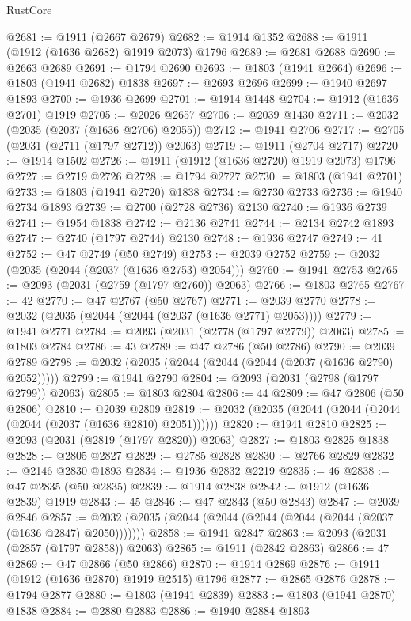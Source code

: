 \begin{lexlean}{RustCore}
\begin{coremodule}
@2681 := @1911 (@2667 @2679)
@2682 := @1914 @1352
@2688 := @1911 (@1912 (@1636 @2682) @1919 @2073) @1796
@2689 := @2681 @2688
@2690 := @2663 @2689
@2691 := @1794 @2690
@2693 := @1803 (@1941 @2664)
@2696 := @1803 (@1941 @2682) @1838
@2697 := @2693 @2696
@2699 := @1940 @2697 @1893
@2700 := @1936 @2699
@2701 := @1914 @1448
@2704 := @1912 (@1636 @2701) @1919
@2705 := @2026 @2657
@2706 := @2039 @1430
@2711 := @2032 (@2035 (@2037 (@1636 @2706) @2055))
@2712 := @1941 @2706
@2717 := @2705 (@2031 (@2711 (@1797 @2712)) @2063)
@2719 := @1911 (@2704 @2717)
@2720 := @1914 @1502
@2726 := @1911 (@1912 (@1636 @2720) @1919 @2073) @1796
@2727 := @2719 @2726
@2728 := @1794 @2727
@2730 := @1803 (@1941 @2701)
@2733 := @1803 (@1941 @2720) @1838
@2734 := @2730 @2733
@2736 := @1940 @2734 @1893
@2739 := @2700 (@2728 @2736) @2130
@2740 := @1936 @2739
@2741 := @1954 @1838
@2742 := @2136 @2741
@2744 := @2134 @2742 @1893
@2747 := @2740 (@1797 @2744) @2130
@2748 := @1936 @2747
@2749 := 41
@2752 := @47 @2749 (@50 @2749)
@2753 := @2039 @2752
@2759 := @2032 (@2035 (@2044 (@2037 (@1636 @2753) @2054)))
@2760 := @1941 @2753
@2765 := @2093 (@2031 (@2759 (@1797 @2760)) @2063)
@2766 := @1803 @2765
@2767 := 42
@2770 := @47 @2767 (@50 @2767)
@2771 := @2039 @2770
@2778 := @2032 (@2035 (@2044 (@2044 (@2037 (@1636 @2771) @2053))))
@2779 := @1941 @2771
@2784 := @2093 (@2031 (@2778 (@1797 @2779)) @2063)
@2785 := @1803 @2784
@2786 := 43
@2789 := @47 @2786 (@50 @2786)
@2790 := @2039 @2789
@2798 := @2032 (@2035 (@2044 (@2044 (@2044 (@2037 (@1636 @2790) @2052)))))
@2799 := @1941 @2790
@2804 := @2093 (@2031 (@2798 (@1797 @2799)) @2063)
@2805 := @1803 @2804
@2806 := 44
@2809 := @47 @2806 (@50 @2806)
@2810 := @2039 @2809
@2819 := @2032 (@2035 (@2044 (@2044 (@2044 (@2044 (@2037 (@1636 @2810) @2051))))))
@2820 := @1941 @2810
@2825 := @2093 (@2031 (@2819 (@1797 @2820)) @2063)
@2827 := @1803 @2825 @1838
@2828 := @2805 @2827
@2829 := @2785 @2828
@2830 := @2766 @2829
@2832 := @2146 @2830 @1893
@2834 := @1936 @2832 @2219
@2835 := 46
@2838 := @47 @2835 (@50 @2835)
@2839 := @1914 @2838
@2842 := @1912 (@1636 @2839) @1919
@2843 := 45
@2846 := @47 @2843 (@50 @2843)
@2847 := @2039 @2846
@2857 := @2032 (@2035 (@2044 (@2044 (@2044 (@2044 (@2044 (@2037 (@1636 @2847) @2050)))))))
@2858 := @1941 @2847
@2863 := @2093 (@2031 (@2857 (@1797 @2858)) @2063)
@2865 := @1911 (@2842 @2863)
@2866 := 47
@2869 := @47 @2866 (@50 @2866)
@2870 := @1914 @2869
@2876 := @1911 (@1912 (@1636 @2870) @1919 @2515) @1796
@2877 := @2865 @2876
@2878 := @1794 @2877
@2880 := @1803 (@1941 @2839)
@2883 := @1803 (@1941 @2870) @1838
@2884 := @2880 @2883
@2886 := @1940 @2884 @1893

\end{coremodule}
\end{lexlean}
